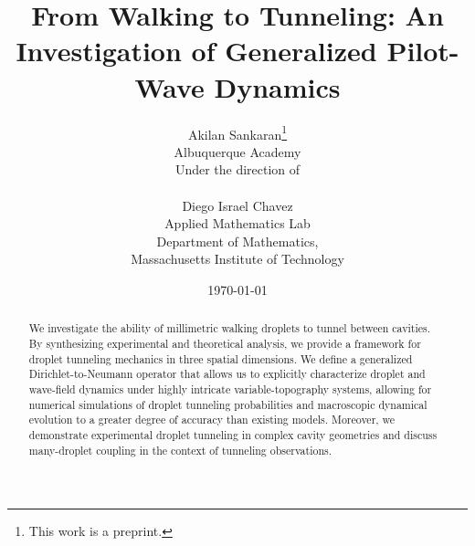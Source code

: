 \documentclass[12pt,titlepage]{article}
\theoremstyle{definition}
\theoremstyle{remark}
\begin{document}


\title{From Walking to Tunneling: An Investigation of Generalized Pilot-Wave Dynamics}

\author{
Akilan Sankaran\footnote{This work is a preprint.
} \\
Albuquerque Academy
\vspace{0.5in}\\
Under the direction of\\
\\
Diego Israel Chavez\\
Applied Mathematics Lab\\
Department of Mathematics,\\
Massachusetts Institute of Technology\\
\vspace{0in}
}


\date{
\today
}


\maketitle

\begin{abstract}
\begin{singlespace}

We investigate the ability of millimetric walking droplets to tunnel between cavities. By synthesizing experimental and theoretical analysis, we provide a framework for droplet tunneling mechanics in three spatial dimensions. We define a generalized Dirichlet-to-Neumann operator that allows us to explicitly characterize droplet and wave-field dynamics under highly intricate variable-topography systems, allowing for numerical simulations of droplet tunneling probabilities and macroscopic dynamical evolution to a greater degree of accuracy than existing models. Moreover, we demonstrate experimental droplet tunneling in complex cavity geometries and discuss many-droplet coupling in the context of tunneling observations.
\vspace{1in}
\end{singlespace}
\end{abstract}
\end{document}
